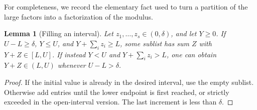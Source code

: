 \documentclass[11pt,reqno]{amsart}
\newtheorem{lemma}[theorem]{Lemma}
\theoremstyle{definition}
\theoremstyle{remark}
\numberwithin{equation}{section}
\begin{document}
For completeness, we record the elementary fact used to turn a partition
of the large factors into a factorization of the modulus.
\begin{lemma}[Filling an interval]\label{lem:fill}
Let $z_1,\ldots,z_s\in(0,\delta)$, and let $Y\ge0$.
If $U-L\ge\delta$, $Y\le U$, and $Y+\sum_i z_i\ge L$, some sublist has
sum $Z$ with $Y+Z\in[L,U]$. If instead $Y<U$ and
$Y+\sum_i z_i>L$, one can obtain $Y+Z\in(L,U)$ whenever $U-L>\delta$.
\end{lemma}
\begin{proof}
If the initial value is already in the desired interval, use the empty
sublist. Otherwise add entries until the lower endpoint is first reached,
or strictly exceeded in the open-interval version. The last increment is
less than $\delta$.
\end{proof}
\end{document}
